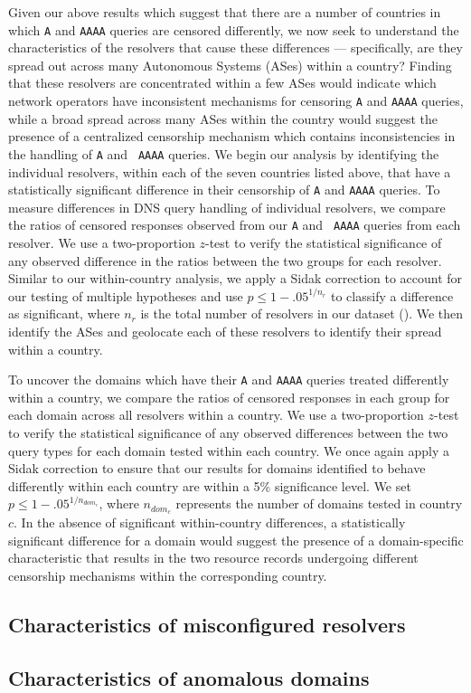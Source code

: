 Given our above results which suggest that there are a number of countries in
which {\tt A} and {\tt AAAA} queries are censored differently, we now seek to
understand the characteristics of the resolvers that cause these differences
--- specifically, are they spread out across many Autonomous Systems (ASes)
within a country? Finding that these resolvers are concentrated within a few
ASes would indicate which network operators have inconsistent mechanisms for
censoring {\tt A} and {\tt AAAA} queries, while a broad spread across many ASes
within the country would suggest the presence of a centralized censorship
mechanism which contains inconsistencies in the handling of {\tt A} and {\tt
AAAA} queries. 
%
We begin our analysis by identifying the individual resolvers, within each of
the seven countries listed above, that have a statistically significant
difference in their censorship of {\tt A} and {\tt AAAA} queries.
%
To measure differences in DNS query handling of individual resolvers, we
compare the ratios of censored responses observed from our {\tt A} and {\tt
AAAA} queries {from each resolver}.  
%
We use a two-proportion $z$-test to verify the statistical significance of any
observed difference in the ratios between the two groups for each resolver.
Similar to our within-country analysis, we apply a Sidak correction to account
for our testing of multiple hypotheses and use $p \leq 1-{.05}^{1/n_r}$ to
classify a difference as significant, where $n_r$ is the total number of
resolvers in our dataset ().
%
We then identify the ASes and geolocate each of these resolvers to identify
their spread within a country.


To uncover the domains which have their {\tt A} and {\tt AAAA} queries treated
differently within a country, we compare the ratios of censored responses in
each group for each domain across all resolvers within a country.  
%
We use a two-proportion $z$-test to verify the statistical significance of any
observed differences between the two query types for each domain tested within
each country. We once again apply a Sidak correction to ensure that our results
for domains identified to behave differently within each country are within
a 5\% significance level. We set $p \leq 1-{.05}^{1/n_{dom_{c}}}$, where
$n_{dom_{c}}$ represents the number of domains tested in country $c$.
%
In the absence of significant within-country differences, a statistically
significant difference for a domain would suggest the presence of
a domain-specific characteristic that results in the two resource records
undergoing different censorship mechanisms within the corresponding country.


\subsection{Characteristics of misconfigured resolvers}
\label{sec:resources:resolvers}



\subsection{Characteristics of anomalous domains} 
\label{sec:resources:domains}
